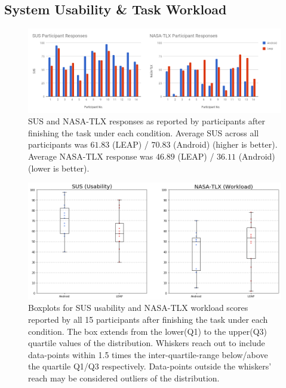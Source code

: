\subsection{System Usability \& Task Workload}

\begin{figure}[htbp]
    \centering
   \includegraphics[width=1\textwidth]{figures/SUS_NASATLX_chart.png}
    \caption{
    \textsf{SUS and NASA-TLX responses as reported by participants after finishing the task under each condition. Average SUS across all participants was $61.83$ (LEAP) / $70.83$ (Android) (higher is better).
    Average NASA-TLX response was $46.89$ (LEAP) / $36.11$ (Android) (lower is better).}
    }
    \label{fig:sus_nasatlx_response}
\end{figure}

\begin{figure}[htbp]
    \centering
    \includegraphics[width=1\textwidth]{figures/sus_nasatlx_boxplot.png}
    \caption{
    \textsf{Boxplots for SUS usability and NASA-TLX workload scores reported by all 15 participants after finishing the task under each condition.
    The box extends from the lower(Q1) to the upper(Q3) quartile values of the distribution.
    Whiskers reach out to include data-points within 1.5 times the inter-quartile-range below/above the quartile Q1/Q3 respectively.
    Data-points outside the whiskers' reach may be considered outliers of the distribution.}
    }
    \label{fig:sus_nasatlx_boxplots}
\end{figure}

